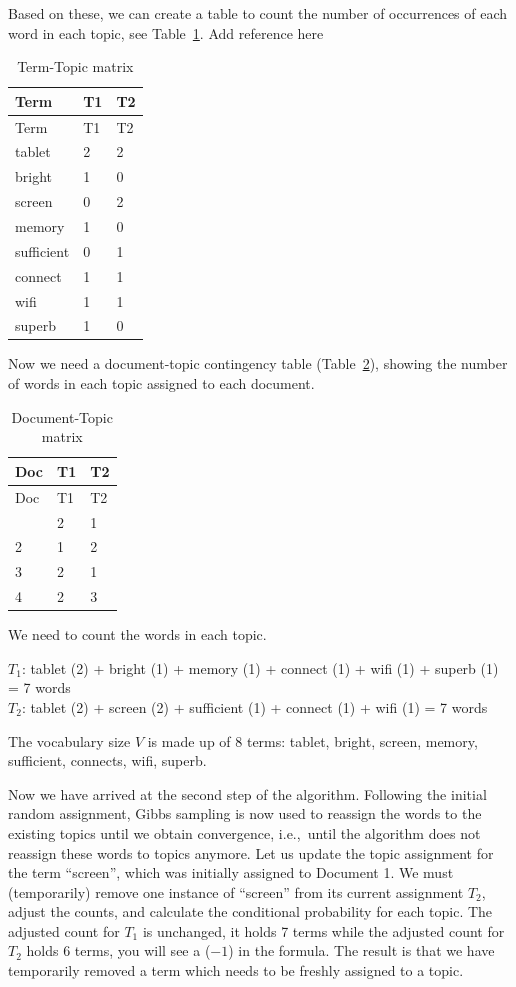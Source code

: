 Based on these, we can create a table to count the
number of occurrences of each word in each topic, see Table~\ref{tbl-tab}. Add reference here

\begin{longtable}[]{@{}lll@{}}
\caption{Term-Topic matrix}\label{tbl-tab}\tabularnewline
\toprule\noalign{}
Term & T1 & T2 \\
\midrule\noalign{}
\endfirsthead
\toprule\noalign{}
Term & T1 & T2 \\
\midrule\noalign{}
\endhead
\bottomrule\noalign{}
\endlastfoot
tablet & 2 & 2 \\
bright & 1 & 0 \\
screen & 0 & 2 \\
memory & 1 & 0 \\
sufficient & 0 & 1 \\
connect & 1 & 1 \\
wifi & 1 & 1 \\
superb & 1 & 0 \\
\end{longtable}

Now we need a document-topic contingency table
(Table~\ref{tbl-documenttopiccounts}), showing the number of words in
each topic assigned to each document.

\begin{longtable}[]{@{}lll@{}}
\caption{Document-Topic
matrix}\label{tbl-documenttopiccounts}\tabularnewline
\toprule\noalign{}
Doc & T1 & T2 \\
\midrule\noalign{}
\endfirsthead
\toprule\noalign{}
Doc & T1 & T2 \\
\midrule\noalign{}
\endhead
\bottomrule\noalign{}
\endlastfoot
1 & 2 & 1 \\
2 & 1 & 2 \\
3 & 2 & 1 \\
4 & 2 & 3 \\
\end{longtable}

We need to count the words in each topic.

\(T_1\): tablet (2) + bright (1) + memory (1) + connect (1) + wifi (1) +
superb (1) = 7 words\\
\(T_2\): tablet (2) + screen (2) + sufficient (1) + connect (1) + wifi
(1) = 7 words

The vocabulary size \(V\) is made up of 8 terms: tablet, bright, screen,
memory, sufficient, connects, wifi, superb.

Now we have arrived at the second step of the algorithm. Following the initial random
assignment, Gibbs sampling is now used to reassign
the words to the existing topics until we obtain convergence, i.e.,~until
the algorithm does not reassign these words to topics anymore. Let us
update the topic assignment for the term ``screen'', which was initially assigned
to Document 1. We must (temporarily) remove one instance of ``screen'' from its current assignment \(T_2\), adjust the counts, and
calculate the conditional probability for each topic. The adjusted count
for \(T_1\) is unchanged, it holds 7 terms while the adjusted count for
\(T_2\) holds 6 terms, you will see a (\(-1\)) in the formula. The result is that we have temporarily removed a term which needs to be freshly assigned to
a topic.

